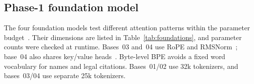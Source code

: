 \subsection{Phase-1 foundation model}
The four foundation models test different attention patterns within the parameter budget~\cite{vaswani2017attention}. Their dimensions are listed in Table~\ref{tab:foundations}, and parameter counts were checked at runtime. Bases~03 and~04 use RoPE and RMSNorm~\cite{su2021roformer,zhang2019rmsnorm}; base~04 also shares key/value heads~\cite{ainslie2023gqa}. Byte-level BPE avoids a fixed word vocabulary for names and legal citations. Bases~01/02 use 32k tokenizers, and bases~03/04 use separate 25k tokenizers.
